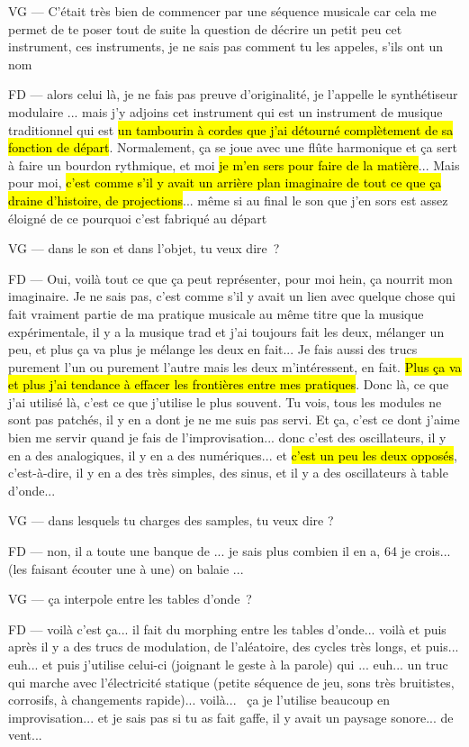 VG — C'était très bien de commencer par une séquence musicale car cela me permet de te poser tout de suite la question de décrire un petit peu cet instrument, ces instruments, je ne sais pas comment tu les appeles, s'ils ont un nom 

FD — alors celui là, je ne fais pas preuve d'originalité, je l'appelle le synthétiseur modulaire ... mais j'y adjoins cet instrument qui est un instrument de musique traditionnel qui est \hl{un tambourin à cordes que j'ai détourné complètement de sa fonction de départ}. Normalement, ça se joue avec une flûte harmonique et ça sert à faire un bourdon rythmique, et moi \hl{je m'en sers pour faire de la matière}... Mais pour moi, \hl{c'est comme s'il y avait un arrière plan imaginaire de tout ce que ça draine d'histoire, de projections}... même si au final le son que j'en sors est assez éloigné de ce pourquoi c'est fabriqué au départ 

VG — dans le son et dans l'objet, tu veux dire ? 

FD — Oui, voilà tout ce que ça peut représenter, pour moi hein, ça nourrit mon imaginaire. Je ne sais pas, c'est comme s'il y avait un lien avec quelque chose qui fait vraiment partie de ma pratique musicale au même titre que la musique expérimentale, il  y a la musique trad et j'ai toujours fait les deux, mélanger un peu, et plus ça va plus je mélange les deux en fait... Je fais aussi des trucs purement l'un ou purement l'autre mais les deux m'intéressent, en fait. \hl{Plus ça va et plus j'ai tendance à effacer les frontières entre mes pratiques}. Donc là, ce que j'ai utilisé là, c'est ce que j'utilise le plus souvent. Tu vois, tous les modules ne sont pas patchés, il y en a dont je ne me suis pas servi. Et ça, c'est ce dont j'aime bien me servir quand je fais de l'improvisation... donc c'est des oscillateurs, il y en a des analogiques, il y en a des numériques... et \hl{c'est un peu les deux opposés}, c'est-à-dire, il y en a des très simples, des sinus, et il y a des oscillateurs à table d'onde... 

VG — dans lesquels tu charges des samples, tu veux dire ? 

FD — non, il a toute une banque de ... je sais plus combien il en a, 64 je crois... (les faisant écouter une à une) on balaie ... 

VG — ça interpole entre les tables d'onde ? 

FD — voilà c'est ça... il fait du morphing entre les tables d'onde... voilà et puis après il y a des trucs de modulation, de l'aléatoire, des cycles très longs, et puis... euh... et puis j'utilise celui-ci (joignant le geste à la parole) qui ... euh... un truc qui marche avec l'électricité statique (petite séquence de jeu, sons très bruitistes, corrosifs, à changements rapide)... voilà...  ça je l'utilise beaucoup en improvisation... et je sais pas si tu as fait gaffe, il y avait un paysage sonore... de vent... 

